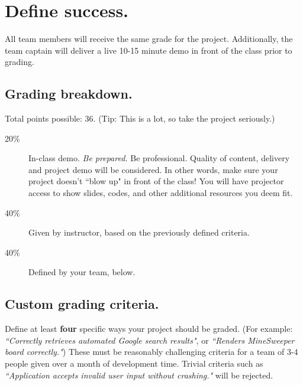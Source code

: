 \documentclass[11pt]{article}
\begin{document}
\pagebreak

\section{Define success.}
All team members will receive the same grade for the project. Additionally, the team captain will deliver a live 10-15 minute demo in front of the class prior to grading.

\subsection{Grading breakdown.}

Total points possible: 36. (Tip: This is a lot, so take the project seriously.)

\begin{description}
\item[20\%] In-class demo. {\it Be prepared.} Be professional. Quality of content, delivery and project demo will be considered. In other words, make sure your project doesn't ``blow up" in front of the class! You will have projector access to show slides, codes, and other additional resources you deem fit. 
\item[40\%] Given by instructor, based on the previously defined criteria.
\item[40\%] Defined by your team, below.
\end{description}

\subsection{Custom grading criteria.}

Define at least {\bf four} specific ways your project should be graded. (For example: {\it ``Correctly retrieves automated Google search results"}, or {\it ``Renders MineSweeper board correctly."}) These must be reasonably challenging criteria for a team of 3-4 people given over a month of development time. Trivial criteria such as {\it ``Application accepts invalid user input without crashing."} will be rejected.

\underline{\phantom{\hspace{5in}}}

\underline{\phantom{\hspace{5in}}}

\underline{\phantom{\hspace{5in}}}

\underline{\phantom{\hspace{5in}}}
\end{document}
